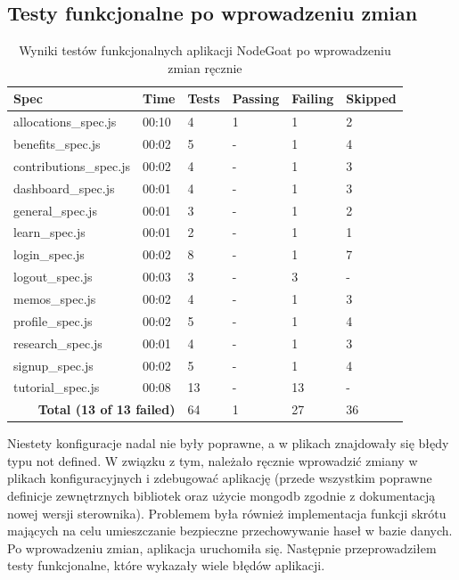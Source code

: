 \subsection{Testy funkcjonalne po wprowadzeniu zmian}
\begin{table}[H]
  \centering
  \caption{Wyniki testów funkcjonalnych aplikacji NodeGoat po wprowadzeniu zmian ręcznie}
  \label{table:test_results}
  \begin{tabular}{|l|l|l|l|l|l|}
  \hline
  \textbf{Spec} & \textbf{Time} & \textbf{Tests} & \textbf{Passing} & \textbf{Failing} & \textbf{Skipped} \\ \hline
  allocations\_spec.js & 00:10 & 4 & 1 & 1 & 2 \\ \hline
  benefits\_spec.js & 00:02 & 5 & - & 1 & 4 \\ \hline
  contributions\_spec.js & 00:02 & 4 & - & 1 & 3 \\ \hline
  dashboard\_spec.js & 00:01 & 4 & - & 1 & 3 \\ \hline
  general\_spec.js & 00:01 & 3 & - & 1 & 2 \\ \hline
  learn\_spec.js & 00:01 & 2 & - & 1 & 1 \\ \hline
  login\_spec.js & 00:02 & 8 & - & 1 & 7 \\ \hline
  logout\_spec.js & 00:03 & 3 & - & 3 & - \\ \hline
  memos\_spec.js & 00:02 & 4 & - & 1 & 3 \\ \hline
  profile\_spec.js & 00:02 & 5 & - & 1 & 4 \\ \hline
  research\_spec.js & 00:01 & 4 & - & 1 & 3 \\ \hline
  signup\_spec.js & 00:02 & 5 & - & 1 & 4 \\ \hline
  tutorial\_spec.js & 00:08 & 13 & - & 13 & - \\ \hline
  \multicolumn{2}{|r|}{\textbf{Total (13 of 13 failed)}} & 64 & 1 & 27 & 36 \\ \hline
  \end{tabular}
  \end{table}
\normalsize

Niestety konfiguracje nadal nie były poprawne, a w plikach znajdowały się błędy typu not defined. W związku z tym, należało ręcznie wprowadzić zmiany w plikach konfiguracyjnych i zdebugować aplikację (przede wszystkim poprawne definicje zewnętrznych bibliotek oraz użycie mongodb zgodnie z dokumentacją nowej wersji sterownika). Problemem była również implementacja funkcji skrótu mających na celu umieszczanie bezpieczne przechowywanie haseł w bazie danych. Po wprowadzeniu zmian, aplikacja uruchomiła się. Następnie przeprowadziłem testy funkcjonalne, które wykazały wiele błędów aplikacji.


